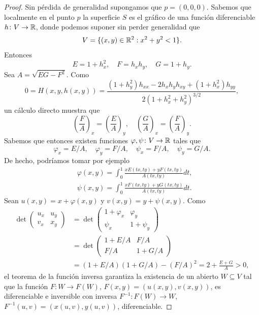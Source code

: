 \begin{proof}
	Sin pérdida de generalidad supongamos que $p=(0,0,0)$. Sabemos que
	localmente en el punto $p$ la superficie $S$ es el gráfico de una función
	diferenciable $h\colon V\to\mathbb{R}$, donde podemos suponer sin perder
	generalidad que
	\[
		V=\{(x,y)\in\mathbb{R}^2:x^2+y^2<1\}.
	\]
	Entonces 
	\[
		E=1+h_x^2,\quad
		F=h_xh_y,\quad
		G=1+h_y.
	\]
	Sea $A=\sqrt{EG-F^2}$. Como 
	\[
		0=H(x,y,h(x,y))=\frac{(1+h_y^2)h_{xx}-2h_xh_yh_{xy}+(1+h_x^2)h_{yy}}{2(1+h_x^2+h_y^2)^{3/2}},
	\]
	un cálculo directo muestra que 
	\[
		\left(\frac{F}{A}\right)_x=\left(\frac{E}{A}\right)_y,\quad
		\left(\frac{G}{A}\right)_x=\left(\frac{F}{A}\right)_y.
	\]
	Sabemos que entonces existen funciones $\varphi,\psi\colon V\to\mathbb{R}$ tales que
	\[
		\varphi_x=E/A,\quad
		\varphi_y=F/A,\quad
		\psi_x=F/A,\quad
		\psi_y=G/A.
	\]
	De hecho, podríamos tomar por ejemplo
	\begin{align*}
		&\varphi(x,y)=\int_0^1\frac{xE(tx,ty)+yF(tx,ty)}{A(tx,ty)}dt,\\
		&\psi(x,y)=\int_0^1\frac{xF(tx,ty)+yG(tx,ty)}{A(tx,ty)}dt.
	\end{align*}
	Sean $u(x,y)=x+\varphi(x,y)$ y $v(x,y)=y+\psi(x,y)$. Como
	\begin{align*}
		\det\begin{pmatrix}
			u_x & u_y\\
			v_x & x_y
		\end{pmatrix}
		&=\det\begin{pmatrix}
			1+\varphi_x & \varphi_y\\
			\psi_x & 1+\psi_y
		\end{pmatrix}\\
		&=\det\begin{pmatrix}
			1+E/A & F/A\\
			F/A & 1+G/A
		\end{pmatrix}\\
		&=(1+E/A)(1+G/A)-(F/A)^2=2+\frac{E+G}{A}>0,
	\end{align*}
	el teorema de la función inversa garantiza la existencia de un abierto
	$W\subseteq V$ tal que la función $F\colon W\to F(W)$,
	$F(x,y)=(u(x,y),v(x,y))$, es diferenciable e inversible con inversa
	$F^{-1}\colon F(W)\to W$, $F^{-1}(u,v)=(x(u,v),y(u,v))$, diferenciable. 


\end{proof}
